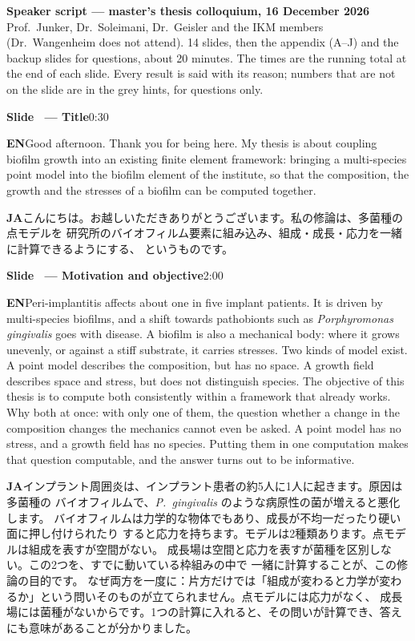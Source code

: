 \documentclass[11pt,a4paper]{article}
\newcounter{sl}
\newcommand{\slide}[2]{\stepcounter{sl}\vspace{8pt}%
  {\color{c3}\large\bfseries Slide \thesl\ --- #1}\hfill{\small #2}\par\vspace{2pt}}
\newcommand{\EN}{\textbf{EN}\quad}
\newcommand{\JA}{\par\textbf{JA}\quad}
\begin{document}
{\Large\bfseries Speaker script --- master's thesis colloquium, 16 December 2026}\\[2pt]
Prof.\ Junker, Dr.\ Soleimani, Dr.\ Geisler and the IKM members (Dr.\ Wangenheim does not attend).
14 slides, then the appendix (A--J) and the backup slides for questions, about 20 minutes. The times are the
running total at the end of each slide. Every result is said with its reason; numbers that are not on the slide
are in the grey hints, for questions only.

\slide{Title}{0:30}
\EN Good afternoon. Thank you for being here. My thesis is about coupling
biofilm growth into an existing finite element framework: bringing a
multi-species point model into the biofilm element of the institute, so that
the composition, the growth and the stresses of a biofilm can be computed
together.
\JA こんにちは。お越しいただきありがとうございます。私の修論は、多菌種の点モデルを
研究所のバイオフィルム要素に組み込み、組成・成長・応力を一緒に計算できるようにする、
というものです。

\slide{Motivation and objective}{2:00}
\EN Peri-implantitis affects about one in five implant patients. It is driven
by multi-species biofilms, and a shift towards pathobionts such as
\textit{Porphyromonas gingivalis} goes with disease. A biofilm is also a
mechanical body: where it grows unevenly, or against a stiff substrate, it
carries stresses. Two kinds of model exist. A point model describes the
composition, but has no space. A growth field describes space and stress, but
does not distinguish species. The objective of this thesis is to compute both
consistently within a framework that already works.
Why both at once: with only one of them, the question whether a change in the composition changes the mechanics
cannot even be asked. A point model has no stress, and a growth field has no species. Putting them in one
computation makes that question computable, and the answer turns out to be informative.
\JA インプラント周囲炎は、インプラント患者の約5人に1人に起きます。原因は多菌種の
バイオフィルムで、\textit{P.~gingivalis} のような病原性の菌が増えると悪化します。
バイオフィルムは力学的な物体でもあり、成長が不均一だったり硬い面に押し付けられたり
すると応力を持ちます。モデルは2種類あります。点モデルは組成を表すが空間がない。
成長場は空間と応力を表すが菌種を区別しない。この2つを、すでに動いている枠組みの中で
一緒に計算することが、この修論の目的です。
なぜ両方を一度に：片方だけでは「組成が変わると力学が変わるか」という問いそのものが立てられません。点モデルには応力がなく、
成長場には菌種がないからです。1つの計算に入れると、その問いが計算でき、答えにも意味があることが分かりました。
\end{document}
